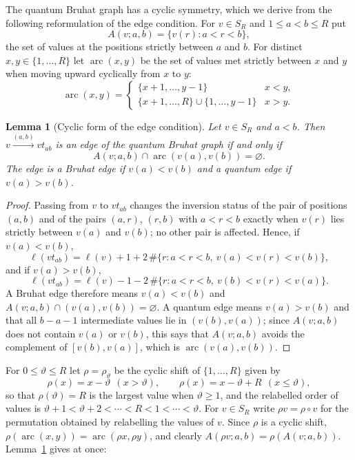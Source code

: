 \documentclass[11pt]{article}
\newtheorem{lemma}[proposition]{Lemma}
\newcommand{\ellength}{\ell}
\begin{document}
The quantum Bruhat graph has a cyclic symmetry, which we derive from
the following reformulation of the edge condition. For $v\in S_R$ and
$1\leq a<b\leq R$ put
\[
 A(v;a,b)=\{v(r):a<r<b\},
\]
the set of values at the positions strictly between $a$ and $b$.
For distinct $x,y\in\{1,\ldots,R\}$ let $\operatorname{arc}(x,y)$ be
the set of values met strictly between $x$ and $y$ when moving
upward cyclically from $x$ to $y$:
\[
 \operatorname{arc}(x,y)=
 \begin{cases}
  \{x+1,\ldots,y-1\}& x<y,\\
  \{x+1,\ldots,R\}\cup\{1,\ldots,y-1\}& x>y.
 \end{cases}
\]

\begin{lemma}[Cyclic form of the edge condition]\label{lem:arc}
Let $v\in S_R$ and $a<b$. Then $v\xrightarrow{(a,b)}vt_{ab}$ is an
edge of the quantum Bruhat graph if and only if
\[
 A(v;a,b)\cap\operatorname{arc}(v(a),v(b))=\varnothing .
\]
The edge is a Bruhat edge if $v(a)<v(b)$ and a quantum edge if
$v(a)>v(b)$.
\end{lemma}

\begin{proof}
Passing from $v$ to $vt_{ab}$ changes the inversion status of the pair
of positions $(a,b)$ and of the pairs $(a,r)$, $(r,b)$ with $a<r<b$
exactly when $v(r)$ lies strictly between $v(a)$ and $v(b)$; no other
pair is affected. Hence, if $v(a)<v(b)$,
\[
 \ellength(vt_{ab})=\ellength(v)+1+2\,\#\{r:a<r<b,\ v(a)<v(r)<v(b)\},
\]
and if $v(a)>v(b)$,
\[
 \ellength(vt_{ab})=\ellength(v)-1-2\,\#\{r:a<r<b,\ v(b)<v(r)<v(a)\}.
\]
A Bruhat edge therefore means $v(a)<v(b)$ and
$A(v;a,b)\cap(v(a),v(b))=\varnothing$. A quantum edge means
$v(a)>v(b)$ and that all $b-a-1$ intermediate values lie in
$(v(b),v(a))$; since $A(v;a,b)$ does not contain $v(a)$ or $v(b)$,
this says that $A(v;a,b)$ avoids the complement of $[v(b),v(a)]$,
which is $\operatorname{arc}(v(a),v(b))$.
\end{proof}

For $0\leq\vartheta\leq R$ let $\rho=\rho_\vartheta$ be the cyclic
shift of $\{1,\ldots,R\}$ given by
\[
 \rho(x)=x-\vartheta\ \ (x>\vartheta),\qquad
 \rho(x)=x-\vartheta+R\ \ (x\leq\vartheta),
\]
so that $\rho(\vartheta)=R$ is the largest value when
$\vartheta\geq1$, and the relabelled order of values is
$\vartheta+1<\vartheta+2<\cdots<R<1<\cdots<\vartheta$.
For $v\in S_R$ write $\rho v=\rho\circ v$ for the permutation
obtained by relabelling the values of $v$. Since $\rho$ is a cyclic
shift, $\rho(\operatorname{arc}(x,y))=\operatorname{arc}(\rho x,\rho y)$,
and clearly $A(\rho v;a,b)=\rho(A(v;a,b))$. Lemma~\ref{lem:arc} gives
at once:
\end{document}
